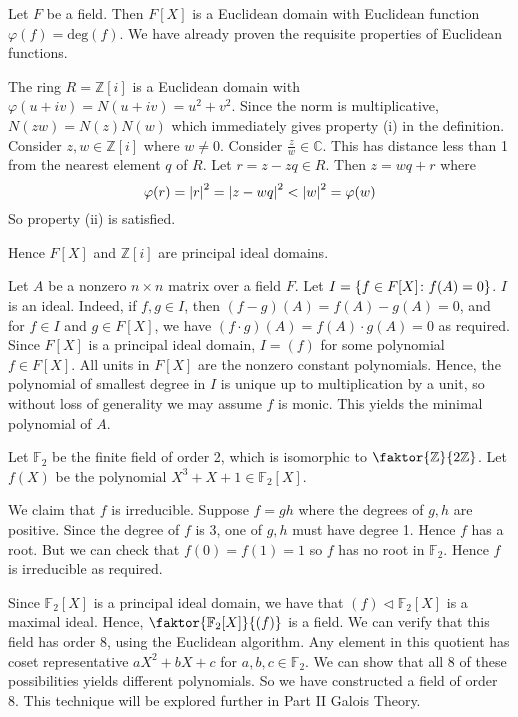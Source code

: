 \begin{example}
	Let \( F \) be a field.
	Then \( F[X] \) is a Euclidean domain with Euclidean function \( \varphi(f) = \mathrm{deg}(f) \).
	We have already proven the requisite properties of Euclidean functions.

	The ring \( R = \mathbb Z[i] \) is a Euclidean domain with \( \varphi(u+iv) = N(u+iv) = u^2+v^2 \).
	Since the norm is multiplicative, \( N(zw) = N(z)N(w) \) which immediately gives property (i) in the definition.
	Consider \( z, w \in \mathbb Z[i] \) where \( w \neq 0 \).
	Consider \( \frac{z}{w} \in \mathbb C \).
	This has distance less than 1 from the nearest element \( q \) of \( R \).
	Let \( r = z - z q \in R \).
	Then \( z = w q + r \) where
	\[
		\varphi(r) = \abs{r}^2 = \abs{z - w q}^2 < \abs{w}^2 = \varphi(w)
	\]
	So property (ii) is satisfied.

	Hence \( F[X] \) and \( \mathbb Z[i] \) are principal ideal domains.
\end{example}
\begin{example}
	Let \( A \) be a nonzero \( n \times n \) matrix over a field \( F \).
	Let \( I = \qty{f \in F[X] \colon f(A) = 0} \).
	\( I \) is an ideal.
	Indeed, if \( f, g \in I \), then \( (f-g)(A) = f(A) - g(A) = 0 \), and for \( f \in I \) and \( g \in F[X] \), we have \( (f \cdot g)(A) = f(A) \cdot g(A) = 0 \) as required.
	Since \( F[X] \) is a principal ideal domain, \( I = (f) \) for some polynomial \( f \in F[X] \).
	All units in \( F[X] \) are the nonzero constant polynomials.
	Hence, the polynomial of smallest degree in \( I \) is unique up to multiplication by a unit, so without loss of generality we may assume \( f \) is monic.
	This yields the minimal polynomial of \( A \).
\end{example}
\begin{example}
	Let \( \mathbb F_2 \) be the finite field of order 2, which is isomorphic to \( \faktor{\mathbb Z}{2 \mathbb Z} \).
	Let \( f(X) \) be the polynomial \( X^3 + X + 1 \in \mathbb F_2[X] \).

	We claim that \( f \) is irreducible.
	Suppose \( f = gh \) where the degrees of \( g, h \) are positive.
	Since the degree of \( f \) is 3, one of \( g, h \) must have degree 1.
	Hence \( f \) has a root.
	But we can check that \( f(0) = f(1) = 1 \) so \( f \) has no root in \( \mathbb F_2 \).
	Hence \( f \) is irreducible as required.

	Since \( \mathbb F_2[X] \) is a principal ideal domain, we have that \( (f) \triangleleft \mathbb F_2[X] \) is a maximal ideal.
	Hence, \( \faktor{\mathbb F_2[X]}{(f)} \) is a field.
	We can verify that this field has order 8, using the Euclidean algorithm.
	Any element in this quotient has coset representative \( aX^2 + bX + c \) for \( a,b,c \in \mathbb F_2 \).
	We can show that all 8 of these possibilities yields different polynomials.
	So we have constructed a field of order 8.
	This technique will be explored further in Part II Galois Theory.
\end{example}
